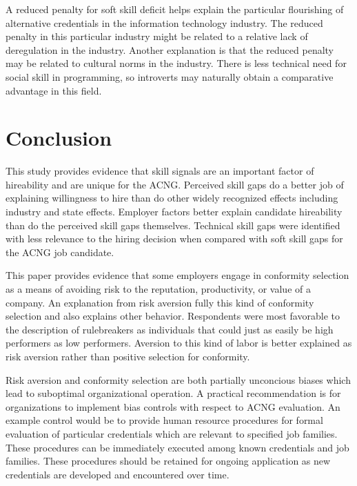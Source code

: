 \documentclass[review]{elsarticle}
\begin{document}
A reduced penalty for soft skill deficit helps explain the particular flourishing of alternative credentials in the information technology industry.
The reduced penalty in this particular industry might be related to a relative lack of deregulation in the industry.
Another explanation is that the reduced penalty may be related to cultural norms in the industry.
There is less technical need for social skill in programming, so introverts may naturally obtain a comparative advantage in this field.

\section{Conclusion}

This study provides evidence that skill signals are an important factor of hireability and are unique for the ACNG.
Perceived skill gaps do a better job of explaining willingness to hire than do other widely recognized effects including industry and state effects.
Employer factors better explain candidate hireability than do the perceived skill gaps themselves.
Technical skill gaps were identified with less relevance to the hiring decision when compared with soft skill gaps for the ACNG job candidate.

This paper provides evidence that some employers engage in conformity selection as a means of avoiding risk to the reputation, productivity, or value of a company.
An explanation from risk aversion fully this kind of conformity selection and also explains other behavior.
Respondents were most favorable to the description of rulebreakers as individuals that could just as easily be high performers as low performers.
Aversion to this kind of labor is better explained as risk aversion rather than positive selection for conformity.

Risk aversion and conformity selection are both partially unconcious biases which lead to suboptimal organizational operation.
A practical recommendation is for organizations to implement bias controls with respect to ACNG evaluation.
An example control would be to provide human resource procedures for formal evaluation of particular credentials which are relevant to specified job families.
These procedures can be immediately executed among known credentials and job families.
These procedures should be retained for ongoing application as new credentials are developed and encountered over time.
\end{document}

